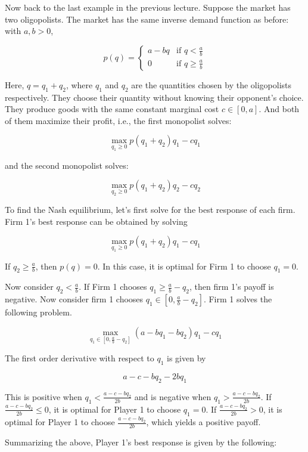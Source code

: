 \documentclass[12pt, oneside]{article}
\begin{document}
Now back to the last example in the previous lecture. Suppose the market has two oligopolists. The market
has the same inverse demand function as before: with \( a, b > 0 \),

\[
p(q) =
\begin{cases}
a - bq & \text{if } q < \frac{a}{b} \\
0 & \text{if } q \geq \frac{a}{b}
\end{cases}
\]

Here, \( q = q_1 + q_2 \), where \( q_1 \) and \( q_2 \) are the quantities chosen by the oligopolists respectively. They choose their quantity without knowing their opponent’s choice. They produce goods with the same constant marginal cost \( c \in [0,a] \). And both of them maximize their profit, i.e., the first monopolist solves:

\[
\max_{q_1 \geq 0} p(q_1 + q_2) q_1 - c q_1
\]

and the second monopolist solves:

\[
\max_{q_2 \geq 0} p(q_1 + q_2) q_2 - c q_2
\]

To find the Nash equilibrium, let’s first solve for the best response of each firm. Firm 1’s best response can be obtained by solving

\[
\max_{q_1 \geq 0} p(q_1 + q_2) q_1 - c q_1
\]

If \( q_2 \geq \frac{a}{b} \), then \( p(q) = 0 \). In this case, it is optimal for Firm 1 to choose \( q_1 = 0 \).

Now consider \( q_2 < \frac{a}{b} \). If Firm 1 chooses \( q_1 \geq \frac{a}{b} - q_2 \), then firm 1’s payoff is negative. Now consider firm 1 chooses \( q_1 \in [0, \frac{a}{b} - q_2] \). Firm 1 solves the following problem.

\[
\max_{q_1 \in [0, \frac{a}{b} - q_2]} (a - b q_1 - b q_2) q_1 - c q_1
\]

The first order derivative with respect to \( q_1 \) is given by

\[
a - c - b q_2 - 2 b q_1
\]

This is positive when \( q_1 < \frac{a - c - bq_2}{2b} \) and is negative when \( q_1 > \frac{a - c - bq_2}{2b} \). If \( \frac{a - c - bq_2}{2b} \leq 0 \), it is optimal for Player 1 to choose \( q_1 = 0 \). If \( \frac{a - c - bq_2}{2b} > 0 \), it is optimal for Player 1 to choose \( \frac{a - c - bq_2}{2b} \), which yields a positive payoff.

Summarizing the above, Player 1’s best response is given by the following:
\end{document}
